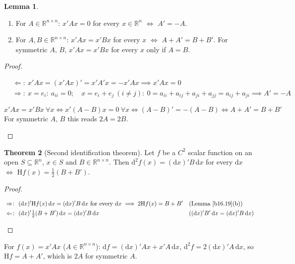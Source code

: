 \documentclass[12pt]{article}
\newcommand{\R}{\mathbb R}
\theoremstyle{definition}
\newtheorem{theorem}{Theorem}
\newtheorem{lemma}[theorem]{Lemma}
\newcommand{\lec}[1]{Lecture~#1}
\newcommand{\boardtop}{\vspace*{-\abovedisplayskip}}
\begin{document}
\begin{lemma}\label{b16.19}
\begin{enumerate}
\item For \(A\in\R^{n\times n}\): \(x'Ax=0\) for every \(x\in\R^n\) \(\iff\) \(A'=-A\).
\item For \(A,B\in\R^{n\times n}\): \(x'Ax=x'Bx\) for every \(x\) \(\iff\) \(A+A'=B+B'\). For symmetric \(A\), \(B\),
\(x'Ax=x'Bx\) for every \(x\) only if \(A=B\).
\end{enumerate}
\end{lemma}
\begin{proof}
\begin{board}[(a) A number is its own transpose; \(e_i'Ae_j=a_{ij}\) (\lec{1}, Proposition~11(a)):]
\boardtop
\begin{align*}
&\Leftarrow\colon\ x'Ax=(x'Ax)'=x'A'x=-x'Ax\implies x'Ax=0\\
&\Rightarrow\colon\ x=e_i\colon\ a_{ii}=0;\quad x=e_i+e_j\ (i\ne j)\colon\ 0=a_{ii}+a_{ij}+a_{ji}+a_{jj}=a_{ij}+a_{ji}
\implies A'=-A
\end{align*}
\end{board}
\begin{board}[(b) (a) for \(A-B\):]
\[
x'Ax=x'Bx\ \forall x\iff x'(A-B)x=0\ \forall x\iff(A-B)'=-(A-B)\iff A+A'=B+B'
\]
For symmetric \(A\), \(B\) this reads \(2A=2B\).
\end{board}
\nopagebreak
\end{proof}

\begin{theorem}[Second identification theorem]\label{b16.32}
Let \(f\) be a \(C^2\) scalar function on an open \(S\subseteq\R^n\), \(x\in S\) and \(B\in\R^{n\times n}\). Then
\(\mathrm{d}^2f(x)=(\mathrm{d}x)'B\,\mathrm{d}x\) for every \(\mathrm{d}x\) \(\iff\) \(\mathrm Hf(x)=\frac12(B+B')\).
\end{theorem}
\begin{proof}
\begin{board}[\(\mathrm Hf(x)\) and \(\frac12(B+B')\) are symmetric; \(\mathrm{d}^2f=(\mathrm{d}x)'\mathrm Hf\,\mathrm{d}x\)
(Definition~\ref{b16.31}):]
\boardtop
\begin{align*}
&\Rightarrow\colon\ (\mathrm{d}x)'\mathrm Hf(x)\,\mathrm{d}x=(\mathrm{d}x)'B\,\mathrm{d}x\text{ for every }\mathrm{d}x
\implies2\mathrm Hf(x)=B+B'&&\text{(Lemma~\ref{b16.19}(b))}\\
&\Leftarrow\colon\ (\mathrm{d}x)'\tfrac12(B+B')\,\mathrm{d}x=(\mathrm{d}x)'B\,\mathrm{d}x
&&((\mathrm{d}x)'B'\,\mathrm{d}x=(\mathrm{d}x)'B\,\mathrm{d}x)
\end{align*}
\end{board}
\nopagebreak
\end{proof}
For \(f(x)=x'Ax\) (\(A\in\R^{n\times n}\)): \(\mathrm{d}f=(\mathrm{d}x)'Ax+x'A\,\mathrm{d}x\),
\(\mathrm{d}^2f=2(\mathrm{d}x)'A\,\mathrm{d}x\), so \(\mathrm Hf=A+A'\), which is \(2A\) for symmetric \(A\).
\end{document}

